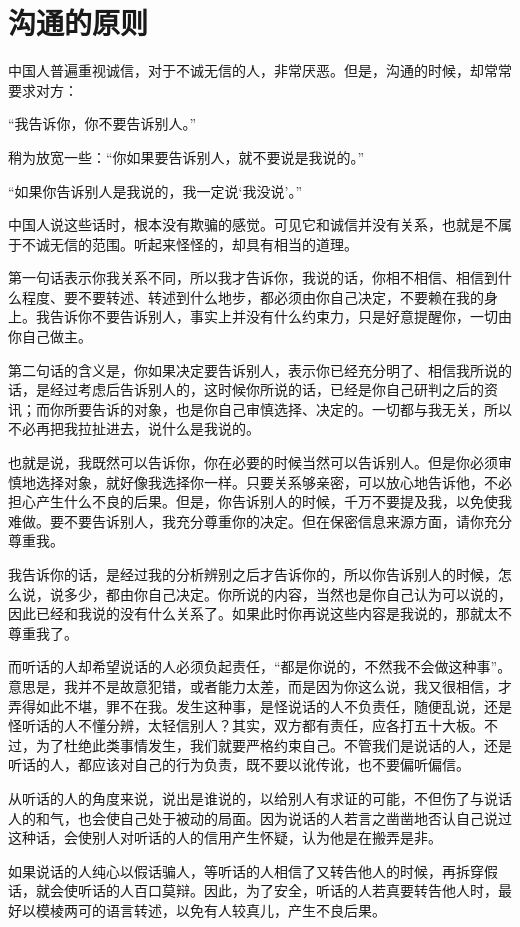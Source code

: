 \documentclass[fontset=fandol, a4paper, 12pt, openright]{ctexbook}
\begin{document}
\chapter{沟通的原则}
中国人普遍重视诚信，对于不诚无信的人，非常厌恶。但是，沟通的时候，却常常要求对方：

“我告诉你，你不要告诉别人。”

稍为放宽一些：“你如果要告诉别人，就不要说是我说的。”

“如果你告诉别人是我说的，我一定说‘我没说’。”

中国人说这些话时，根本没有欺骗的感觉。可见它和诚信并没有关系，也就是不属于不诚无信的范围。听起来怪怪的，却具有相当的道理。

第一句话表示你我关系不同，所以我才告诉你，我说的话，你相不相信、相信到什么程度、要不要转述、转述到什么地步，都必须由你自己决定，不要赖在我的身上。我告诉你不要告诉别人，事实上并没有什么约束力，只是好意提醒你，一切由你自己做主。

第二句话的含义是，你如果决定要告诉别人，表示你已经充分明了、相信我所说的话，是经过考虑后告诉别人的，这时候你所说的话，已经是你自己研判之后的资讯；而你所要告诉的对象，也是你自己审慎选择、决定的。一切都与我无关，所以不必再把我拉扯进去，说什么是我说的。

也就是说，我既然可以告诉你，你在必要的时候当然可以告诉别人。但是你必须审慎地选择对象，就好像我选择你一样。只要关系够亲密，可以放心地告诉他，不必担心产生什么不良的后果。但是，你告诉别人的时候，千万不要提及我，以免使我难做。要不要告诉别人，我充分尊重你的决定。但在保密信息来源方面，请你充分尊重我。

我告诉你的话，是经过我的分析辨别之后才告诉你的，所以你告诉别人的时候，怎么说，说多少，都由你自己决定。你所说的内容，当然也是你自己认为可以说的，因此已经和我说的没有什么关系了。如果此时你再说这些内容是我说的，那就太不尊重我了。

而听话的人却希望说话的人必须负起责任，“都是你说的，不然我不会做这种事”。意思是，我并不是故意犯错，或者能力太差，而是因为你这么说，我又很相信，才弄得如此不堪，罪不在我。发生这种事，是怪说话的人不负责任，随便乱说，还是怪听话的人不懂分辨，太轻信别人？其实，双方都有责任，应各打五十大板。不过，为了杜绝此类事情发生，我们就要严格约束自己。不管我们是说话的人，还是听话的人，都应该对自己的行为负责，既不要以讹传讹，也不要偏听偏信。

从听话的人的角度来说，说出是谁说的，以给别人有求证的可能，不但伤了与说话人的和气，也会使自己处于被动的局面。因为说话的人若言之凿凿地否认自己说过这种话，会使别人对听话的人的信用产生怀疑，认为他是在搬弄是非。

如果说话的人纯心以假话骗人，等听话的人相信了又转告他人的时候，再拆穿假话，就会使听话的人百口莫辩。因此，为了安全，听话的人若真要转告他人时，最好以模棱两可的语言转述，以免有人较真儿，产生不良后果。
\end{document}
